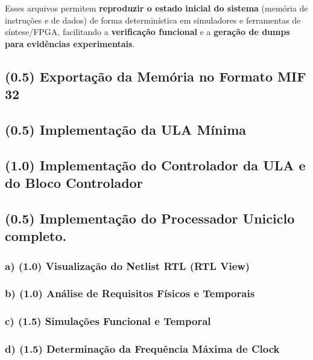 \documentclass[12pt,a4paper]{article}
\begin{document}
Esses arquivos permitem \textbf{reproduzir o estado inicial do sistema} (memória de instruções e de dados) de forma determinística em simuladores e ferramentas de síntese/FPGA, facilitando a \textbf{verificação funcional} e a \textbf{geração de dumps para evidências experimentais}.

\subsection{(0.5) Exportação da Memória no Formato MIF 32}

\subsection{(0.5) Implementação da ULA Mínima}

\subsection{(1.0) Implementação do Controlador da ULA e do Bloco Controlador}

\subsection{(0.5) Implementação do Processador Uniciclo completo.}

\subsubsection{a) (1.0) Visualização do Netlist RTL (RTL View)}

\subsubsection{b) (1.0) Análise de Requisitos Físicos e Temporais}

\subsubsection{c) (1.5) Simulações Funcional e Temporal}

\subsubsection{d) (1.5) Determinação da Frequência Máxima de Clock}


\end{document}
